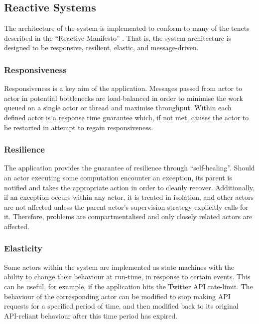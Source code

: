 \documentclass{l4proj}
\begin{document}
        \subsection{Reactive Systems}
        The architecture of the system is implemented to conform to many of the tenets described in the ``Reactive Manifesto'' \cite{reactive}. That is, the system architecture is designed to be responsive, resilient, elastic, and message-driven.
        
            \subsubsection{Responsiveness}
            Responsiveness is a key aim of the application. Messages passed from actor to actor in potential bottlenecks are load-balanced in order to minimise the work queued on a single actor or thread and maximise throughput. Within each defined actor is a response time guarantee which, if not met, causes the actor to be restarted in attempt to regain responsiveness. 
            
            \subsubsection{Resilience}
            The application provides the guarantee of resilience through ``self-healing''. Should an actor executing some computation encounter an exception, its parent is notified and takes the appropriate action in order to cleanly recover. Additionally, if an exception occurs within any actor, it is treated in isolation, and other actors are not affected unless the parent actor's supervision strategy explicitly calls for it. Therefore, problems are compartmentalised and only closely related actors are affected.
            
            \subsubsection{Elasticity}
            Some actors within the system are implemented as state machines with the ability to change their behaviour at run-time, in response to certain events. This can be useful, for example, if the application hits the Twitter API rate-limit. The behaviour of the corresponding actor can be modified to stop making API requests for a specified period of time, and then modified back to its original API-reliant behaviour after this time period has expired.
            
\end{document}
